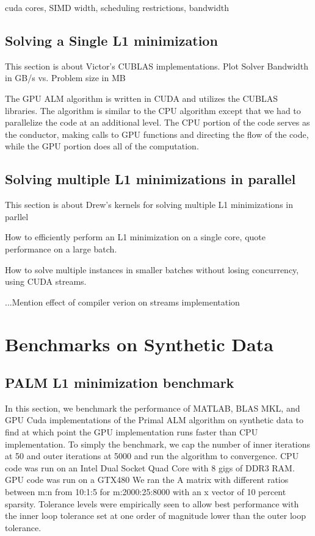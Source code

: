 \documentclass[10pt,twocolumn,letterpaper]{article}
\begin{document}
cuda cores, SIMD width, scheduling restrictions, bandwidth
\subsection{Solving a Single L1 minimization}
This section is about Victor's CUBLAS implementations.
Plot Solver Bandwidth in GB/s vs. Problem size in MB

The GPU ALM algorithm is written in CUDA and utilizes the CUBLAS libraries.  The algorithm is similar to the CPU algorithm except that we had to parallelize the code at an additional level. The CPU portion of the code serves as the conductor, making calls to GPU functions and directing the flow of the code, while the GPU portion does all of the computation.

\subsection{Solving multiple L1 minimizations in parallel}
This section is about Drew's kernels for solving multiple L1 minimizations in parllel

How to efficiently perform an L1 minimization on a single core, quote performance on a large batch.

How to solve multiple instances in smaller batches without losing concurrency, using CUDA streams.

...Mention effect of compiler verion on streams implementation

\section{Benchmarks on Synthetic Data}
\subsection{PALM L1 minimization benchmark}

In this section, we benchmark the performance of MATLAB, BLAS MKL, and GPU Cuda implementations of the Primal ALM algorithm on synthetic data to find at which point the GPU implementation runs faster than CPU implementation.
To simply the benchmark, we cap the number of inner iterations at 50 and outer iterations at 5000 and run the algorithm to convergence.
CPU code was run on an Intel Dual Socket Quad Core with 8 gigs of DDR3 RAM.  GPU code was run on a GTX480
We ran the A matrix with different ratios between m:n from 10:1:5 for m:2000:25:8000 with an x vector of 10 percent sparsity.  Tolerance levels were empirically seen to allow best performance with the inner loop tolerance set at one order of magnitude lower than the outer loop tolerance.
\end{document}

